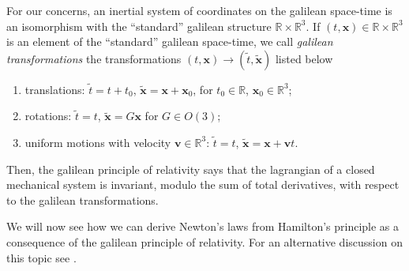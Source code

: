 \documentclass[english,fontsize=11pt,paper=a5,oneside]{scrbook}
\newcommand{\R}{\mathbb{R}}
\newcommand{\bx}{\bm{x}}
\theoremstyle{definition}
\begin{document}
For our concerns, an inertial system of coordinates on the galilean space-time is an isomorphism with the ``standard'' galilean structure $\R\times\R^3$.
If $(t, \bx) \in \R\times \R^3$ is an element of the ``standard'' galilean space-time, we call \emph{galilean transformations} the transformations $(t,\bx) \to (\tilde t, \tilde{\bx})$ listed below
\begin{enumerate}
    \item translations: $\tilde t = t + t_0$, $\tilde{\bx} = \bx + \bx_0$, for $t_0\in\R$, $\bx_0\in\R^3$;
    \item rotations: $\tilde t = t$, $\tilde{\bx} = G\bx$ for $G\in O(3)$;
    \item uniform motions with velocity $\bm{v}\in\R^3$: $\tilde t = t$, $\tilde{\bx} = \bx + \bm{v} t$.
\end{enumerate}
Then, the galilean principle of relativity says that the lagrangian of a closed mechanical system is invariant, modulo the sum of total derivatives, with respect to the galilean transformations.

We will now see how we can derive Newton's laws from Hamilton's principle as a consequence of the galilean principle of relativity. For an alternative discussion on this topic see \cite[Chapters 1.1 and 1.2]{book:arnold}.
\end{document}
